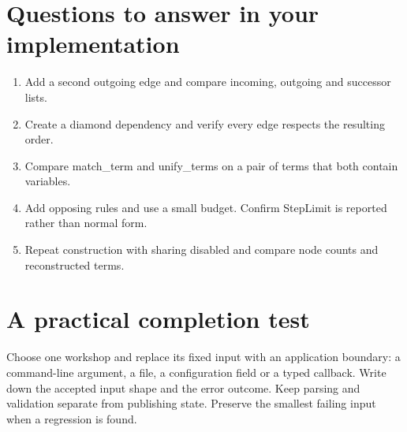 \section*{Questions to answer in your implementation}
\begin{enumerate}
\item Add a second outgoing edge and compare incoming, outgoing and successor lists.
\item Create a diamond dependency and verify every edge respects the resulting order.
\item Compare match\_term and unify\_terms on a pair of terms that both contain variables.
\item Add opposing rules and use a small budget. Confirm StepLimit is reported rather than normal form.
\item Repeat construction with sharing disabled and compare node counts and reconstructed terms.
\end{enumerate}
\section*{A practical completion test}
Choose one workshop and replace its fixed input with an application boundary: a command-line argument, a file, a configuration field or a typed callback. Write down the accepted input shape and the error outcome. Keep parsing and validation separate from publishing state. Preserve the smallest failing input when a regression is found.

